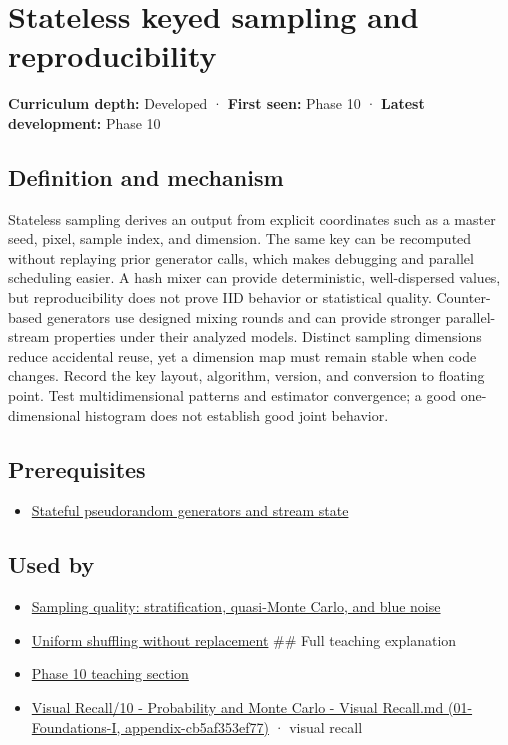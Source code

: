 \hypertarget{appendix-daaf25bfd3a0}{}
\section{Stateless keyed sampling and reproducibility}\label{appendix-daaf25bfd3a0-stateless-keyed-sampling-and-reproducibility}

\textbf{Curriculum depth:} Developed · \textbf{First seen:} Phase 10 · \textbf{Latest development:} Phase 10

\subsection{Definition and mechanism}\label{appendix-daaf25bfd3a0-definition-and-mechanism}

Stateless sampling derives an output from explicit coordinates such as a master seed, pixel, sample index, and dimension. The same key can be recomputed without replaying prior generator calls, which makes debugging and parallel scheduling easier. A hash mixer can provide deterministic, well-dispersed values, but reproducibility does not prove IID behavior or statistical quality. Counter-based generators use designed mixing rounds and can provide stronger parallel-stream properties under their analyzed models. Distinct sampling dimensions reduce accidental reuse, yet a dimension map must remain stable when code changes. Record the key layout, algorithm, version, and conversion to floating point. Test multidimensional patterns and estimator convergence; a good one-dimensional histogram does not establish good joint behavior.

\subsection{Prerequisites}\label{appendix-daaf25bfd3a0-prerequisites}

\begin{itemize}
\tightlist
\item
  \hyperref[appendix-e0f7c7e08f3a]{Stateful pseudorandom generators and stream state}
\end{itemize}

\subsection{Used by}\label{appendix-daaf25bfd3a0-used-by}

\begin{itemize}
\item
  \hyperref[appendix-9f693ffd82bc]{Sampling quality: stratification, quasi-Monte Carlo, and blue noise}
\item
  \hyperref[appendix-184fcc411663]{Uniform shuffling without replacement} \#\# Full teaching explanation
\item
  \hyperref[02-foundations-ii-ch029-a-computer-produces-deterministic-pseudorandom-sequences]{Phase 10 teaching section}
\item
  \href{../01-Foundations-I/main.pdf\#nameddest=appendix-cb5af353ef77}{Visual Recall/10 - Probability and Monte Carlo - Visual Recall.md (01-Foundations-I, appendix-cb5af353ef77)} · visual recall
\end{itemize}

